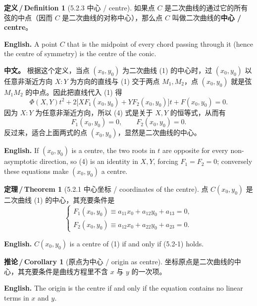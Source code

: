 \documentclass[UTF8,11pt,a4paper]{ctexart}
\newcommand{\APS}[2]{\par\noindent\textbf{中文。} #1\par\noindent\textbf{English.} #2\par\smallskip}
\newcommand{\EN}[1]{\par\noindent \textbf{English.} #1\par}
\theoremstyle{definition}
\newtheorem*{definition}{定义\,/\,Definition}
\newtheorem*{theorem}{定理\,/\,Theorem}
\newtheorem*{corollary}{推论\,/\,Corollary}
\begin{document}
\begin{definition}[5.2.3 中心 / centre]\label{def:centre}
如果点 $C$ 是二次曲线的通过它的所有弦的中点（因而 $C$ 是二次曲线的对称中心），那么点 $C$ 叫做二次曲线的\textbf{中心 / centre}。
\EN{A point $C$ that is the midpoint of every chord passing through it (hence the centre of symmetry) is the centre of the conic.}
\end{definition}

\APS{根据这个定义，当点 $(x_0,y_0)$ 为二次曲线 (1) 的中心时，过 $(x_0,y_0)$ 以任意非渐近方向 $X:Y$ 为方向的直线与 (1) 交于两点 $M_1,M_2$，点 $(x_0,y_0)$ 就是弦 $M_1M_2$ 的中点。因此把直线代入 (1) 得
\[
\Phi(X,Y)t^2+2\bigl[XF_1(x_0,y_0)+YF_2(x_0,y_0)\bigr]t+F(x_0,y_0)=0.\tag{4}
\]
因为 $X:Y$ 为任意非渐近方向，所以 (4) 式是关于 $X,Y$ 的恒等式，从而有
\[
F_1(x_0,y_0)=0,\qquad F_2(x_0,y_0)=0.
\]
反过来，适合上面两式的点 $(x_0,y_0)$，显然是二次曲线的中心。}{If $(x_0,y_0)$ is a centre, the two roots in $t$ are opposite for every non-asymptotic direction, so (4) is an identity in $X,Y$, forcing $F_1=F_2=0$; conversely these equations make $(x_0,y_0)$ a centre.}

\begin{theorem}[5.2.1 中心坐标 / coordinates of the centre]\label{thm:centre}
点 $C(x_0,y_0)$ 是二次曲线 (1) 的中心，其充要条件是
\[
\begin{cases}F_1(x_0,y_0)\equiv a_{11}x_0+a_{12}y_0+a_{13}=0,\\ F_2(x_0,y_0)\equiv a_{12}x_0+a_{22}y_0+a_{23}=0.\end{cases}\tag{5.2-1}
\]
\EN{$C(x_0,y_0)$ is a centre of (1) if and only if (5.2-1) holds.}
\end{theorem}

\begin{corollary}[原点为中心 / origin as centre]\label{cor:origin}
坐标原点是二次曲线的中心，其充要条件是曲线方程里不含 $x$ 与 $y$ 的一次项。
\EN{The origin is the centre if and only if the equation contains no linear terms in $x$ and $y$.}
\end{corollary}
\end{document}
